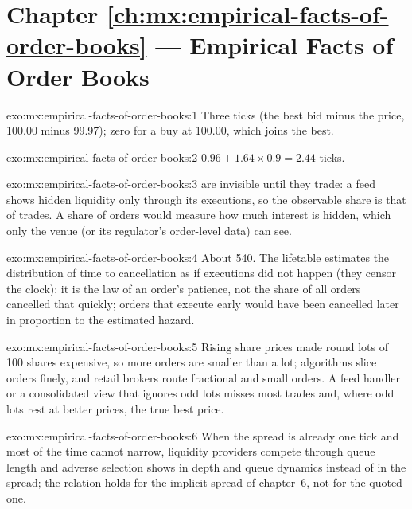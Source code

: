 \section*{Chapter \ref{ch:mx:empirical-facts-of-order-books} --- Empirical Facts of Order Books}

\begin{solution}{exo:mx:empirical-facts-of-order-books:1}
Three ticks (the best bid minus the price, 100.00 minus 99.97); zero for a buy at 100.00, which joins the best.
\end{solution}

\begin{solution}{exo:mx:empirical-facts-of-order-books:2}
$0.96+1.64\times0.9=2.44$ ticks.
\end{solution}

\begin{solution}{exo:mx:empirical-facts-of-order-books:3}
 are invisible until they trade: a feed shows hidden liquidity only through its executions, so the observable share is that of trades.
A share of orders would measure how much interest is hidden, which only the venue (or its regulator's order-level data) can see.
\end{solution}

\begin{solution}{exo:mx:empirical-facts-of-order-books:4}
About 540. The lifetable estimates the distribution of time to cancellation as if executions did not happen (they censor the clock): it is the
law of an order's patience, not the share of all orders cancelled that quickly; orders that execute early would have been cancelled later in
proportion to the estimated hazard.
\end{solution}

\begin{solution}{exo:mx:empirical-facts-of-order-books:5}
Rising share prices made round lots of 100 shares expensive, so more orders are smaller than a lot; algorithms slice orders finely, and retail
brokers route fractional and small orders. A feed handler or a consolidated view that ignores odd lots misses most trades and, where odd lots rest at
better prices, the true best price.
\end{solution}

\begin{solution}{exo:mx:empirical-facts-of-order-books:6}
When the spread is already one tick and most of the time cannot narrow, liquidity providers compete through queue length and adverse selection shows in
depth and queue dynamics instead of in the spread; the relation holds for the implicit spread of chapter~6, not for the quoted one.
\end{solution}


